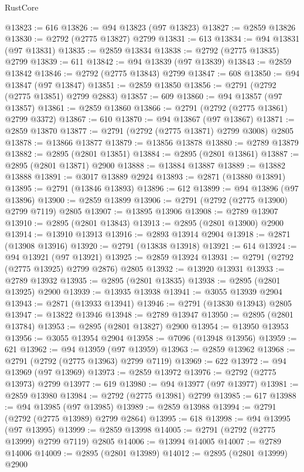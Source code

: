 \begin{lexlean}{RustCore}
\begin{coremodule}
@13823 := 616
@13826 := @94 @13823 (@97 @13823)
@13827 := @2859 @13826
@13830 := @2792 (@2775 @13827) @2799
@13831 := 613
@13834 := @94 @13831 (@97 @13831)
@13835 := @2859 @13834
@13838 := @2792 (@2775 @13835) @2799
@13839 := 611
@13842 := @94 @13839 (@97 @13839)
@13843 := @2859 @13842
@13846 := @2792 (@2775 @13843) @2799
@13847 := 608
@13850 := @94 @13847 (@97 @13847)
@13851 := @2859 @13850
@13856 := @2791 (@2792 (@2775 @13851) @2799 @2883)
@13857 := 609
@13860 := @94 @13857 (@97 @13857)
@13861 := @2859 @13860
@13866 := @2791 (@2792 (@2775 @13861) @2799 @3372)
@13867 := 610
@13870 := @94 @13867 (@97 @13867)
@13871 := @2859 @13870
@13877 := @2791 (@2792 (@2775 @13871) @2799 @3008) @2805
@13878 := @13866 @13877
@13879 := @13856 @13878
@13880 := @2789 @13879
@13882 := @2895 (@2801 @13851)
@13884 := @2895 (@2801 @13861)
@13887 := @2895 (@2801 @13871) @2900
@13888 := @13884 @13887
@13889 := @13882 @13888
@13891 := @3017 @13889 @2924
@13893 := @2871 (@13880 @13891)
@13895 := @2791 (@13846 @13893)
@13896 := 612
@13899 := @94 @13896 (@97 @13896)
@13900 := @2859 @13899
@13906 := @2791 (@2792 (@2775 @13900) @2799 @7119) @2805
@13907 := @13895 @13906
@13908 := @2789 @13907
@13910 := @2895 (@2801 @13843)
@13913 := @2895 (@2801 @13900) @2900
@13914 := @13910 @13913
@13916 := @2893 @13914 @2904
@13918 := @2871 (@13908 @13916)
@13920 := @2791 (@13838 @13918)
@13921 := 614
@13924 := @94 @13921 (@97 @13921)
@13925 := @2859 @13924
@13931 := @2791 (@2792 (@2775 @13925) @2799 @2876) @2805
@13932 := @13920 @13931
@13933 := @2789 @13932
@13935 := @2895 (@2801 @13835)
@13938 := @2895 (@2801 @13925) @2900
@13939 := @13935 @13938
@13941 := @3055 @13939 @2904
@13943 := @2871 (@13933 @13941)
@13946 := @2791 (@13830 @13943) @2805
@13947 := @13822 @13946
@13948 := @2789 @13947
@13950 := @2895 (@2801 @13784)
@13953 := @2895 (@2801 @13827) @2900
@13954 := @13950 @13953
@13956 := @3055 @13954 @2904
@13958 := @7096 (@13948 @13956)
@13959 := 621
@13962 := @94 @13959 (@97 @13959)
@13963 := @2859 @13962
@13968 := @2791 (@2792 (@2775 @13963) @2799 @7119)
@13969 := 622
@13972 := @94 @13969 (@97 @13969)
@13973 := @2859 @13972
@13976 := @2792 (@2775 @13973) @2799
@13977 := 619
@13980 := @94 @13977 (@97 @13977)
@13981 := @2859 @13980
@13984 := @2792 (@2775 @13981) @2799
@13985 := 617
@13988 := @94 @13985 (@97 @13985)
@13989 := @2859 @13988
@13994 := @2791 (@2792 (@2775 @13989) @2799 @2864)
@13995 := 618
@13998 := @94 @13995 (@97 @13995)
@13999 := @2859 @13998
@14005 := @2791 (@2792 (@2775 @13999) @2799 @7119) @2805
@14006 := @13994 @14005
@14007 := @2789 @14006
@14009 := @2895 (@2801 @13989)
@14012 := @2895 (@2801 @13999) @2900

\end{coremodule}
\end{lexlean}
